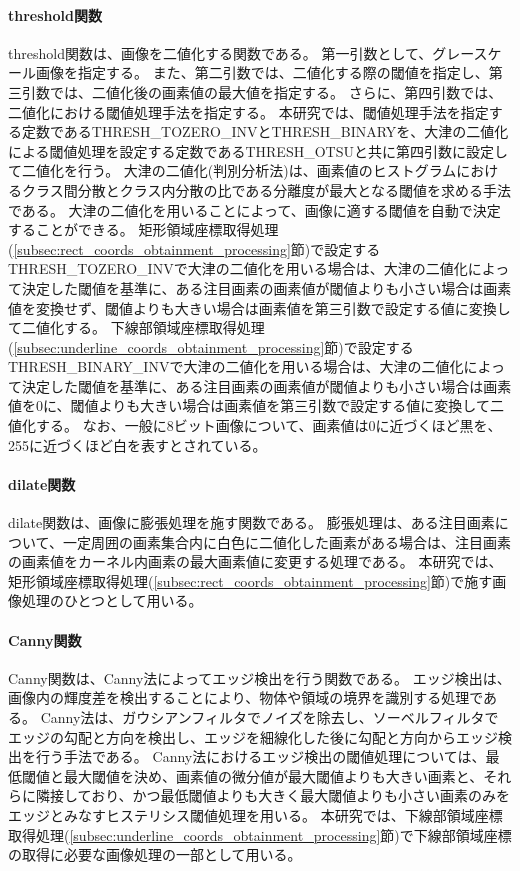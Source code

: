 \paragraph{threshold関数}
threshold関数は、画像を二値化する関数である。
第一引数として、グレースケール画像を指定する。
また、第二引数では、二値化する際の閾値を指定し、第三引数では、二値化後の画素値の最大値を指定する。
さらに、第四引数では、二値化における閾値処理手法を指定する。
本研究では、閾値処理手法を指定する定数であるTHRESH\_TOZERO\_INVとTHRESH\_BINARYを、大津の二値化による閾値処理を設定する定数であるTHRESH\_OTSUと共に第四引数に設定して二値化を行う。
大津の二値化(判別分析法)は、画素値のヒストグラムにおけるクラス間分散とクラス内分散の比である分離度が最大となる閾値を求める手法である\cite{大津の二値化}。
大津の二値化を用いることによって、画像に適する閾値を自動で決定することができる。
矩形領域座標取得処理(\ref{subsec:rect_coords_obtainment_processing}節)で設定するTHRESH\_TOZERO\_INVで大津の二値化を用いる場合は、大津の二値化によって決定した閾値を基準に、ある注目画素の画素値が閾値よりも小さい場合は画素値を変換せず、閾値よりも大きい場合は画素値を第三引数で設定する値に変換して二値化する。
下線部領域座標取得処理(\ref{subsec:underline_coords_obtainment_processing}節)で設定するTHRESH\_BINARY\_INVで大津の二値化を用いる場合は、大津の二値化によって決定した閾値を基準に、ある注目画素の画素値が閾値よりも小さい場合は画素値を0に、閾値よりも大きい場合は画素値を第三引数で設定する値に変換して二値化する。
なお、一般に8ビット画像について、画素値は0に近づくほど黒を、255に近づくほど白を表すとされている\cite{画素値}。


\paragraph{dilate関数}
dilate関数は、画像に膨張処理を施す関数である。
膨張処理は、ある注目画素について、一定周囲の画素集合内に白色に二値化した画素がある場合は、注目画素の画素値をカーネル内画素の最大画素値に変更する処理である\cite{膨張処理}。
本研究では、矩形領域座標取得処理(\ref{subsec:rect_coords_obtainment_processing}節)で施す画像処理のひとつとして用いる。

\paragraph{Canny関数}
Canny関数は、Canny法によってエッジ検出を行う関数である。
エッジ検出は、画像内の輝度差を検出することにより、物体や領域の境界を識別する処理である\cite{エッジ検出}。
Canny法は、ガウシアンフィルタでノイズを除去し、ソーベルフィルタでエッジの勾配と方向を検出し、エッジを細線化した後に勾配と方向からエッジ検出を行う手法である。
Canny法におけるエッジ検出の閾値処理については、最低閾値と最大閾値を決め、画素値の微分値が最大閾値よりも大きい画素と、それらに隣接しており、かつ最低閾値よりも大きく最大閾値よりも小さい画素のみをエッジとみなすヒステリシス閾値処理を用いる\cite{Canny法}。
本研究では、下線部領域座標取得処理(\ref{subsec:underline_coords_obtainment_processing}節)で下線部領域座標の取得に必要な画像処理の一部として用いる。

